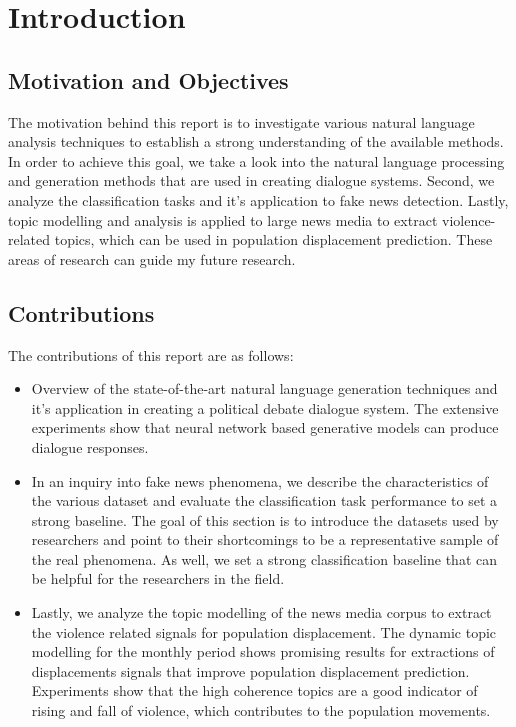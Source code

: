 \chapter{Introduction}

\section{Motivation and Objectives}
The motivation behind this report is to investigate various natural language analysis techniques to establish a strong understanding of the available methods. In order to achieve this goal, we take a look into the natural language processing and generation methods that are used in creating dialogue systems. Second, we analyze the classification tasks and it's application to fake news detection. Lastly, topic modelling and analysis is applied to large news media to extract violence-related topics, which can be used in population displacement prediction. These areas of research can guide my future research.

\section{Contributions}
The contributions of this report are as follows:
 
\begin{itemize}
    \item Overview of the state-of-the-art natural language generation techniques and it's application in creating a political debate dialogue system. The extensive experiments show that neural network based generative models can produce dialogue responses. 
    \item In an inquiry into fake news phenomena, we describe the characteristics of the various dataset and evaluate the classification task performance to set a strong baseline. The goal of this section is to introduce the datasets used by researchers and point to their shortcomings to be a representative sample of the real phenomena. As well, we set a strong classification baseline that can be helpful for the researchers in the field.
    \item Lastly, we analyze the topic modelling of the news media corpus to extract the violence related signals for population displacement. The dynamic topic modelling for the monthly period shows promising results for extractions of displacements signals that improve population displacement prediction. Experiments show that the high coherence topics are a good indicator of rising and fall of violence, which contributes to the population movements.
\end{itemize}
